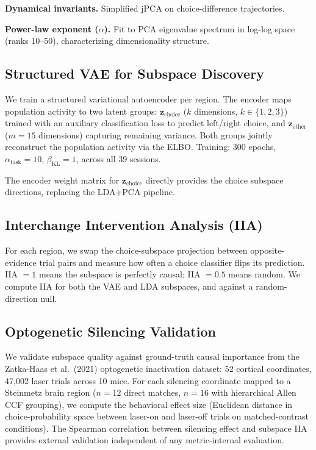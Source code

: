 \documentclass{article}
\begin{document}
\textbf{Dynamical invariants.} Simplified jPCA on choice-difference trajectories.

\textbf{Power-law exponent ($\alpha$).} Fit to PCA eigenvalue spectrum in log-log space (ranks 10--50), characterizing dimensionality structure.

\subsection{Structured VAE for Subspace Discovery}

We train a structured variational autoencoder \citep{narayanaswamy2017learning} per region. The encoder maps population activity to two latent groups: $\mathbf{z}_{\text{choice}}$ ($k$ dimensions, $k \in \{1,2,3\}$) trained with an auxiliary classification loss to predict left/right choice, and $\mathbf{z}_{\text{other}}$ ($m = 15$ dimensions) capturing remaining variance. Both groups jointly reconstruct the population activity via the ELBO. Training: 300 epochs, $\alpha_{\text{task}} = 10$, $\beta_{\text{KL}} = 1$, across all 39 sessions.

The encoder weight matrix for $\mathbf{z}_{\text{choice}}$ directly provides the choice subspace directions, replacing the LDA+PCA pipeline.

\subsection{Interchange Intervention Analysis (IIA)}

For each region, we swap the choice-subspace projection between opposite-evidence trial pairs and measure how often a choice classifier flips its prediction. IIA $= 1$ means the subspace is perfectly causal; IIA $= 0.5$ means random. We compute IIA for both the VAE and LDA subspaces, and against a random-direction null.

\subsection{Optogenetic Silencing Validation}

We validate subspace quality against ground-truth causal importance from the Zatka-Haas et al.\ (2021) optogenetic inactivation dataset: 52 cortical coordinates, 47,002 laser trials across 10 mice. For each silencing coordinate mapped to a Steinmetz brain region ($n = 12$ direct matches, $n = 16$ with hierarchical Allen CCF grouping), we compute the behavioral effect size (Euclidean distance in choice-probability space between laser-on and laser-off trials on matched-contrast conditions). The Spearman correlation between silencing effect and subspace IIA provides external validation independent of any metric-internal evaluation.
\end{document}
